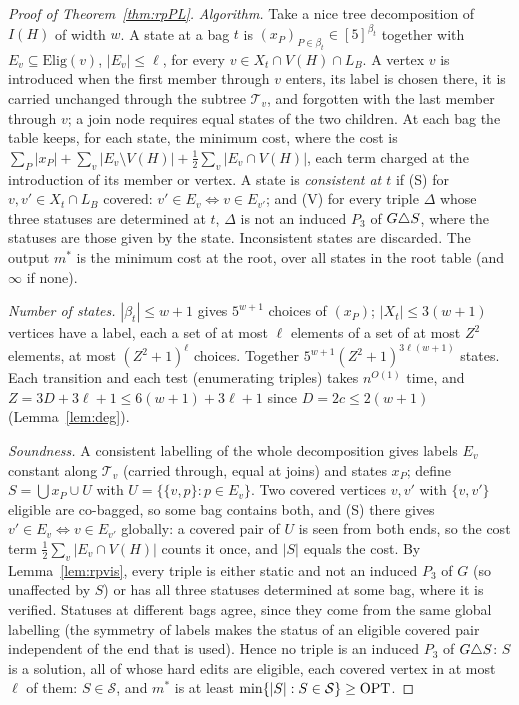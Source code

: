 \begin{proof}[Proof of Theorem~\ref{thm:rpPL}]
\emph{Algorithm.} Take a nice tree decomposition of $I(H)$ of width $w$. A state at a bag $t$ is $(x_P)_{P\in\beta_t}\in[5]^{\beta_t}$ together with $E_v\subseteq\mathrm{Elig}(v)$, $|E_v|\le\ell$, for every $v\in X_t\cap V(H)\cap L_B$. A vertex $v$ is introduced when the first member through $v$ enters, its label is chosen there, it is carried unchanged through the subtree $\mathcal T_v$, and forgotten with the last member through $v$; a join node requires equal states of the two children. At each bag the table keeps, for each state, the minimum cost, where the cost is $\sum_P|x_P|+\sum_v|E_v\setminus V(H)|+\frac12\sum_v|E_v\cap V(H)|$, each term charged at the introduction of its member or vertex. A state is \emph{consistent at $t$} if (S) for $v,v'\in X_t\cap L_B$ covered: $v'\in E_v\iff v\in E_{v'}$; and (V) for every triple $\Delta$ whose three statuses are determined at $t$, $\Delta$ is not an induced $P_3$ of $G\triangle S$, where the statuses are those given by the state. Inconsistent states are discarded. The output $m^*$ is the minimum cost at the root, over all states in the root table (and $\infty$ if none).

\emph{Number of states.} $|\beta_t|\le w+1$ gives $5^{w+1}$ choices of $(x_P)$; $|X_t|\le3(w+1)$ vertices have a label, each a set of at most $\ell$ elements of a set of at most $Z^2$ elements, at most $(Z^2+1)^\ell$ choices. Together $5^{w+1}(Z^2+1)^{3\ell(w+1)}$ states. Each transition and each test (enumerating triples) takes $n^{O(1)}$ time, and $Z=3D+3\ell+1\le6(w+1)+3\ell+1$ since $D=2c\le2(w+1)$ (Lemma~\ref{lem:deg}).

\emph{Soundness.} A consistent labelling of the whole decomposition gives labels $E_v$ constant along $\mathcal T_v$ (carried through, equal at joins) and states $x_P$; define $S=\bigcup x_P\cup U$ with $U=\{\{v,p\}:p\in E_v\}$. Two covered vertices $v,v'$ with $\{v,v'\}$ eligible are co-bagged, so some bag contains both, and (S) there gives $v'\in E_v\iff v\in E_{v'}$ globally: a covered pair of $U$ is seen from both ends, so the cost term $\frac12\sum_v|E_v\cap V(H)|$ counts it once, and $|S|$ equals the cost. By Lemma~\ref{lem:rpvis}, every triple is either static and not an induced $P_3$ of $G$ (so unaffected by $S$) or has all three statuses determined at some bag, where it is verified. Statuses at different bags agree, since they come from the same global labelling (the symmetry of labels makes the status of an eligible covered pair independent of the end that is used). Hence no triple is an induced $P_3$ of $G\triangle S$: $S$ is a solution, all of whose hard edits are eligible, each covered vertex in at most $\ell$ of them: $S\in\mathcal S$, and $m^*$ is at least $\min\{|S|:S\in\mathcal S\}\ge\mathrm{OPT}$.


\end{proof}
